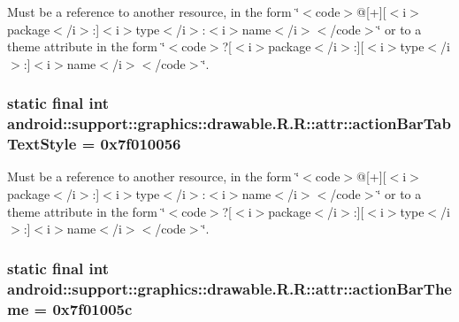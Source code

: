 Must be a reference to another resource, in the form \char`\"{}$<$code$>$@\mbox{[}+\mbox{]}\mbox{[}$<$i$>$package$<$/i$>$:\mbox{]}$<$i$>$type$<$/i$>$:$<$i$>$name$<$/i$>$$<$/code$>$\char`\"{} or to a theme attribute in the form \char`\"{}$<$code$>$?\mbox{[}$<$i$>$package$<$/i$>$:\mbox{]}\mbox{[}$<$i$>$type$<$/i$>$:\mbox{]}$<$i$>$name$<$/i$>$$<$/code$>$\char`\"{}. \hypertarget{classandroid_1_1support_1_1graphics_1_1drawable_1_1_r_1_1attr_004be8c001e4e882ef09e4e7679e2648}{
\subsubsection[{actionBarTabTextStyle}]{\setlength{\rightskip}{0pt plus 5cm}static final int android::support::graphics::drawable.R.R::attr::actionBarTabTextStyle = 0x7f010056}}
\label{classandroid_1_1support_1_1graphics_1_1drawable_1_1_r_1_1attr_004be8c001e4e882ef09e4e7679e2648}


Must be a reference to another resource, in the form \char`\"{}$<$code$>$@\mbox{[}+\mbox{]}\mbox{[}$<$i$>$package$<$/i$>$:\mbox{]}$<$i$>$type$<$/i$>$:$<$i$>$name$<$/i$>$$<$/code$>$\char`\"{} or to a theme attribute in the form \char`\"{}$<$code$>$?\mbox{[}$<$i$>$package$<$/i$>$:\mbox{]}\mbox{[}$<$i$>$type$<$/i$>$:\mbox{]}$<$i$>$name$<$/i$>$$<$/code$>$\char`\"{}. \hypertarget{classandroid_1_1support_1_1graphics_1_1drawable_1_1_r_1_1attr_d3c00f7cdb20162ac5946262d84a4c4a}{
\subsubsection[{actionBarTheme}]{\setlength{\rightskip}{0pt plus 5cm}static final int android::support::graphics::drawable.R.R::attr::actionBarTheme = 0x7f01005c}}
\label{classandroid_1_1support_1_1graphics_1_1drawable_1_1_r_1_1attr_d3c00f7cdb20162ac5946262d84a4c4a}


